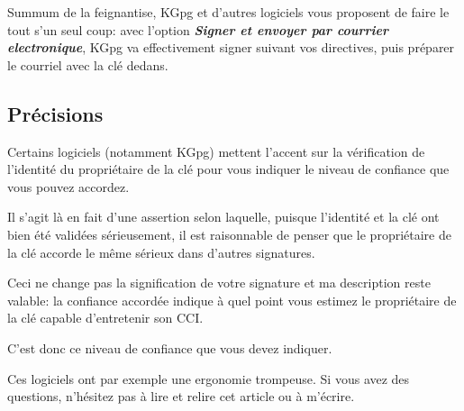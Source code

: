 Summum de la feignantise, KGpg et d'autres logiciels vous proposent de
faire le tout s'un seul coup: avec l'option \textbf{\emph{Signer et
envoyer par courrier electronique}}, KGpg va effectivement signer
suivant vos directives, puis préparer le courriel avec la clé dedans.

\subsection{Précisions}\label{pruxe9cisions}

Certains logiciels (notamment KGpg) mettent l'accent sur la vérification
de l'identité du propriétaire de la clé pour vous indiquer le niveau de
confiance que vous pouvez accordez.

Il s'agit là en fait d'une assertion selon laquelle, puisque l'identité
et la clé ont bien été validées sérieusement, il est raisonnable de
penser que le propriétaire de la clé accorde le même sérieux dans
d'autres signatures.

Ceci ne change pas la signification de votre signature et ma description
reste valable: la confiance accordée indique à quel point vous estimez
le propriétaire de la clé capable d'entretenir son CCI.

C'est donc ce niveau de confiance que vous devez indiquer.

Ces logiciels ont par exemple une ergonomie trompeuse. Si vous avez des
questions, n'hésitez pas à lire et relire cet article ou à m'écrire.